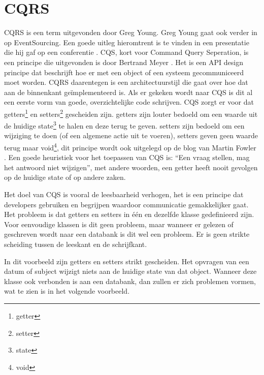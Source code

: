
\chapter{CQRS}
\label{ch:CQRS}

\gls{CQRS} is een term uitgevonden door Greg Young. Greg Young gaat ook verder in op EventSourcing. Een goede uitleg hieromtrent is te vinden in een presentatie die hij gaf op een conferentie \autocite{Young2014CQRSandES}. \gls{CQS}, kort voor Command Query Seperation, is een principe die uitgevonden is door Bertrand Meyer \autocite{Meyer1988}. Het is een API design principe dat beschrijft hoe er met een object of een systeem gecommuniceerd moet worden. CQRS daarentegen is een architectuurstijl die gaat over hoe dat aan de binnenkant geïmplementeerd is. Als er gekeken wordt naar \gls{CQS} is dit al een eerste vorm van goede, overzichtelijke code schrijven. \gls{CQS} zorgt er voor dat \glspl{getter}\footnote{\glsdesc{getter}} en \glspl{setter}\footnote{\glsdesc{setter}} gescheiden zijn. \Glspl{getter} zijn louter bedoeld om een waarde uit de huidige \gls{state}\footnote{\glsdesc{state}} te halen en deze terug te geven. \Glspl{setter} zijn bedoeld om een wijziging te doen (of een algemene actie uit te voeren), \glspl{setter} geven geen waarde terug maar \gls{void}\footnote{\glsdesc{void}}, dit principe wordt ook uitgelegd op de blog van Martin Fowler \autocite{Fowler2005CQS}. Een goede heuristiek voor het toepassen van \gls{CQS} is: ``Een vraag stellen, mag het antwoord niet wijzigen'', met andere woorden, een \gls{getter} heeft nooit gevolgen op de huidige \gls{state} of op andere zaken.

Het doel van \gls{CQS} is vooral de leesbaarheid verhogen, het is een principe dat developers gebruiken en begrijpen waardoor communicatie gemakkelijker gaat.
Het probleem is dat \glspl{getter} en \glspl{setter} in één en dezelfde klasse gedefinieerd zijn. Voor eenvoudige klassen is dit geen probleem, maar wanneer er gelezen of geschreven wordt naar een databank is dit wel een probleem. Er is geen strikte scheiding tussen de leeskant en de schrijfkant.


In dit voorbeeld zijn \glspl{getter} en \glspl{setter} strikt gescheiden. Het opvragen van een datum of subject wijzigt niets aan de huidige \gls{state} van dat object. Wanneer deze klasse ook verbonden is aan een databank, dan zullen er zich problemen vormen, wat te zien is in het volgende voorbeeld.

